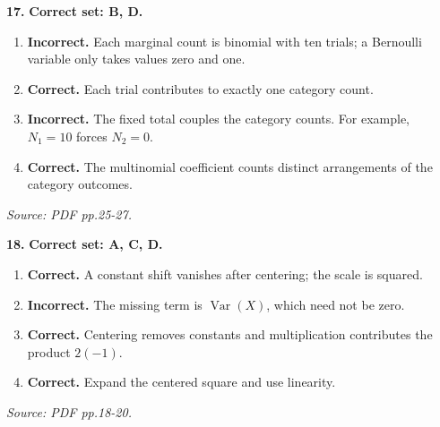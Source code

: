 \documentclass[11pt,a4paper]{article}
\begin{document}
\par\noindent\begin{minipage}{\linewidth}
\textbf{17.} \textbf{Correct set: B, D.}
\begin{enumerate}[label=(\Alph*),leftmargin=8mm,itemsep=2pt,topsep=2pt]
\item \textbf{Incorrect.} Each marginal count is binomial with ten trials; a Bernoulli variable only takes values zero and one.
\item \textbf{Correct.} Each trial contributes to exactly one category count.
\item \textbf{Incorrect.} The fixed total couples the category counts. For example, \(N_1=10\) forces \(N_2=0\).
\item \textbf{Correct.} The multinomial coefficient counts distinct arrangements of the category outcomes.
\end{enumerate}
{\footnotesize\textit{Source: PDF pp.25-27.}}

\end{minipage}\par\vspace{3mm}
\par\noindent\begin{minipage}{\linewidth}
\textbf{18.} \textbf{Correct set: A, C, D.}
\begin{enumerate}[label=(\Alph*),leftmargin=8mm,itemsep=2pt,topsep=2pt]
\item \textbf{Correct.} A constant shift vanishes after centering; the scale is squared.
\item \textbf{Incorrect.} The missing term is \(\operatorname{Var}(X)\), which need not be zero.
\item \textbf{Correct.} Centering removes constants and multiplication contributes the product \(2(-1)\).
\item \textbf{Correct.} Expand the centered square and use linearity.
\end{enumerate}
{\footnotesize\textit{Source: PDF pp.18-20.}}

\end{minipage}\par\vspace{3mm}
\end{document}
